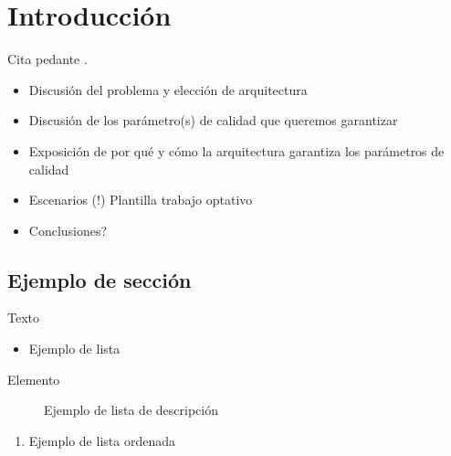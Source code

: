 \chapter{Introducción}

Cita pedante \cite{google01}.

\begin{itemize}
 \item Discusión del problema y elección de arquitectura
 \item Discusión de los parámetro(s) de calidad que queremos garantizar
 \item Exposición de por qué y cómo la arquitectura garantiza los parámetros de calidad
 \item Escenarios (!) Plantilla trabajo optativo
 \item Conclusiones?
\end{itemize}

\section{Ejemplo de sección}

Texto

\begin{itemize}
 \item Ejemplo de lista
\end{itemize}

\begin{description}
 \item[Elemento] Ejemplo de lista de descripción
\end{description}

\begin{enumerate}
 \item Ejemplo de lista ordenada
\end{enumerate}
